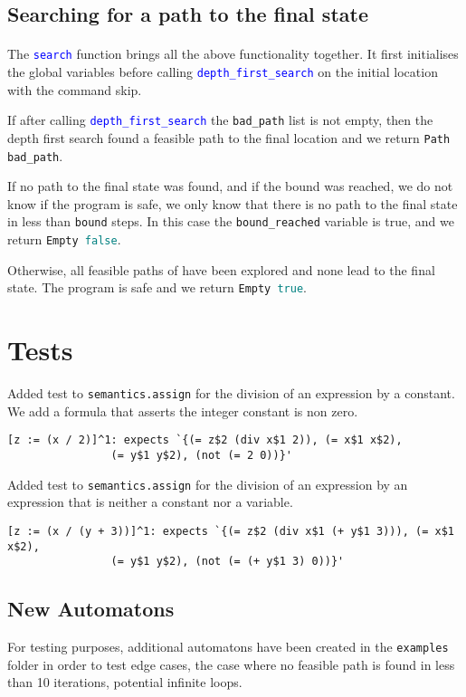\documentclass[letterpaper,12pt]{article}
\begin{document}
\subsection{Searching for a path to the final state}
\paragraph{}
The \texttt{\textcolor{blue}{search}} function brings all the above functionality together.
It first initialises the global variables before calling \texttt{\textcolor{blue}{depth\_first\_search}} on the initial location with the command skip.

If after calling \texttt{\textcolor{blue}{depth\_first\_search}} the \texttt{bad\_path} list is not empty, then the depth first search found a feasible path to the final location and we return \texttt{Path bad\_path}.

If no path to the final state was found, and if the bound was reached, we do not know if the program is safe, we only know that there is no path to the final state in less than \texttt{bound} steps. In this case the \texttt{bound\_reached} variable is true, and we return \texttt{Empty \textcolor{teal}{false}}.

Otherwise, all feasible paths of have been explored and none lead to the final state. The program is safe and we return \texttt{Empty \textcolor{teal}{true}}.


\section{Tests}
Added test to \texttt{semantics.assign} for the division of an expression by a constant. We add a formula that asserts the integer constant is non zero.
\begin{verbatim}
[z := (x / 2)]^1: expects `{(= z$2 (div x$1 2)), (= x$1 x$2),
				(= y$1 y$2), (not (= 2 0))}'
\end{verbatim}
Added test to \texttt{semantics.assign} for the division of an expression by an expression that is neither a constant nor a variable.
\begin{verbatim}
[z := (x / (y + 3))]^1: expects `{(= z$2 (div x$1 (+ y$1 3))), (= x$1 x$2),
				(= y$1 y$2), (not (= (+ y$1 3) 0))}'
\end{verbatim}

\subsection{New Automatons}
For testing purposes, additional automatons have been created in the \texttt{examples} folder in order to test edge cases, the case where no feasible path is found in less than 10 iterations, potential infinite loops.
\end{document}
